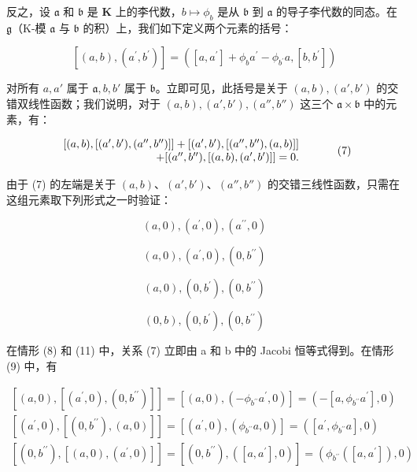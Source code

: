 反之，设 \(\mathfrak{a}\) 和 \(\mathfrak{b}\) 是 \(\mathbf{K}\) 上的李代数，\(b \mapsto \phi_b\) 是从 \(\mathfrak{b}\) 到 \(\mathfrak{a}\) 的导子李代数的同态。在 \(\mathfrak{g}\)（K-模 \(\mathfrak{a}\) 与 \(\mathfrak{b}\) 的积）上，我们如下定义两个元素的括号：

\[
[ (a, b), (a ^ {\prime}, b ^ {\prime}) ] = ([ a, a ^ {\prime} ] + \phi_ {b} a ^ {\prime} - \phi_ {b ^ {\prime}} a, [ b, b ^ {\prime} ])
\]

对所有 \(a, a'\) 属于 \(\mathfrak{a}, b, b'\) 属于 \(\mathfrak{b}\)。立即可见，此括号是关于 \((a, b), (a', b')\) 的交错双线性函数；我们说明，对于 \((a, b), (a', b'), (a'', b'')\) 这三个 \(\mathfrak{a} \times \mathfrak{b}\) 中的元素，有：

\[
\begin{array}{r l} {[ (a, b), [ (a ^ {\prime}, b ^ {\prime}), (a ^ {\prime \prime}, b ^ {\prime \prime}) ] ] + [ (a ^ {\prime}, b ^ {\prime}), [ (a ^ {\prime \prime}, b ^ {\prime \prime}), (a, b) ] ]} & \\ {+ [ (a ^ {\prime \prime}, b ^ {\prime \prime}), [ (a, b), (a ^ {\prime}, b ^ {\prime}) ] ] = 0.} \end{array}\tag{7}
\]

由于 (7) 的左端是关于 \((a, b)\)、\((a', b')\)、\((a'', b'')\) 的交错三线性函数，只需在这组元素取下列形式之一时验证：

\[
(a, 0), (a ^ {\prime}, 0), (a ^ {\prime \prime}, 0)\tag{8}
\]

\[
(a, 0), (a ^ {\prime}, 0), (0, b ^ {\prime \prime})\tag{9}
\]

\[
(a, 0), (0, b ^ {\prime}), (0, b ^ {\prime \prime})\tag{10}
\]

\[
(0, b), (0, b ^ {\prime}), (0, b ^ {\prime \prime})\tag{11}
\]

在情形 (8) 和 (11) 中，关系 (7) 立即由 a 和 b 中的 Jacobi 恒等式得到。在情形 (9) 中，有

\[
\begin{array}{l} [ (a, 0), [ (a ^ {\prime}, 0), (0, b ^ {\prime \prime}) ] ] = [ (a, 0), (- \phi_ {b ^ {\prime \prime}} a ^ {\prime}, 0) ] = (- [ a, \phi_ {b ^ {\prime \prime}} a ^ {\prime} ], 0) \\ {} [ (a ^ {\prime}, 0), [ (0, b ^ {\prime \prime}), (a, 0) ] ] = [ (a ^ {\prime}, 0), (\phi_ {b ^ {\prime \prime}} a, 0) ] = ([ a ^ {\prime}, \phi_ {b ^ {\prime \prime}} a ], 0) \\ {} [ (0, b ^ {\prime \prime}), [ (a, 0), (a ^ {\prime}, 0) ] ] = [ (0, b ^ {\prime \prime}), ([ a, a ^ {\prime} ], 0) ] = (\phi_ {b ^ {\prime \prime}} ([ a, a ^ {\prime} ]), 0) \end{array}
\]

